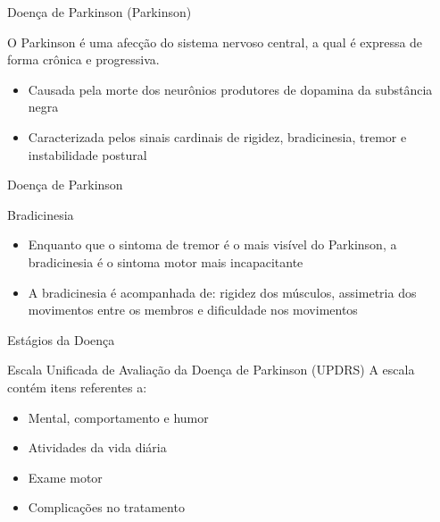 \documentclass{beamer}
\begin{document}
\begin{frame}{Doença de Parkinson (Parkinson)}
  \begin{block}{}
    O Parkinson é uma afecção do sistema nervoso central, a qual é expressa de forma crônica e progressiva. 
      \begin{itemize}
       \item Causada pela morte dos neurônios produtores de dopamina da substância negra ~\cite{protpar010}
       \item Caracterizada pelos sinais cardinais de rigidez, bradicinesia, tremor e instabilidade postural ~\cite{jankovic2008}
      \end{itemize}
  \end{block}
\end{frame}


\begin{frame}{Doença de Parkinson}
  \begin{block}{Bradicinesia}
      \begin{itemize}
	\item Enquanto que o sintoma de tremor é o mais visível do Parkinson, a bradicinesia é o sintoma motor mais incapacitante
	\item A bradicinesia é acompanhada de: rigidez dos músculos, assimetria dos movimentos entre os membros e dificuldade nos movimentos
	\end{itemize}
  \end{block}
\end{frame}
  

\begin{frame}{Estágios da Doença}
  \begin{block}{Escala Unificada de Avaliação da Doença de Parkinson (UPDRS)}
      A escala contém itens referentes a:
	\begin{itemize}
	 \item Mental, comportamento e humor
	 \item Atividades da vida diária
	 \item Exame motor
	 \item Complicações no tratamento
	\end{itemize}
 \end{block}
\end{frame}
\end{document}

